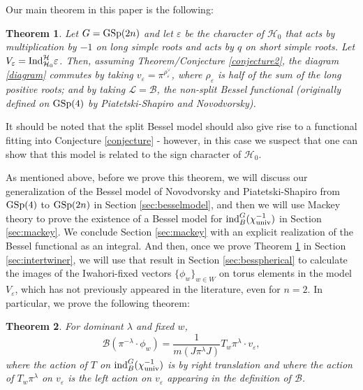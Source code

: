 \documentclass[11pt,letterpaper]{article}
\newcommand{\calL}{\mathcal{L}} %
\newcommand{\calH}{\mathcal{H}} %
\newcommand{\calB}{\mathcal{B}}
\newcommand{\ve}{\varepsilon}
\newcommand{\GSp}{\textup{GSp}}
\newcommand{\Ind}{\textup{Ind}}
\newcommand{\ind}{\textup{ind}}
\newtheorem{Theorem}{Theorem}[section]
\theoremstyle{remark}
\numberwithin{equation}{section}
\begin{document}
Our main theorem in this paper is the following:

\begin{Theorem}\label{thm:main}
Let $G = \GSp(2n)$ and let $\ve$ be the character of $\calH_0$ that acts by multiplication by $-1$ on long simple roots and acts by $q$ on short simple roots. Let $V_{\ve} = \Ind_{\calH_0}^{\calH} \ve$. Then, assuming Theorem/Conjecture \ref{conjecture2}, the diagram \eqref{diagram} commutes by taking $v_{\ve} = \pi^{\rho_{\ve}^{\vee}}$, where $\rho_{\ve}$ is half of the sum of the long positive roots; and by taking $\calL= \calB$, the non-split Bessel functional (originally defined on $\GSp(4)$ by Piatetski-Shapiro and Novodvorsky).
\end{Theorem}

It should be noted that the split Bessel model should also give rise to a functional fitting into Conjecture \ref{conjecture} - however, in this case we suspect that one can show that this model is related to the sign character of $\calH_0$.


As mentioned above, before we prove this theorem, we will discuss our generalization of the Bessel model of Novodvorsky and Piatetski-Shapiro from $\GSp(4)$ to $\GSp(2n)$ in Section \ref{sec:besselmodel}, and then we will use Mackey theory to prove the existence of a Bessel model for $\ind_B^G (\chi_{\textup{univ}}^{-1})$ in Section \ref{sec:mackey}. We conclude Section \ref{sec:mackey} with an explicit realization of the Bessel functional as an integral. And then, once we prove Theorem \ref{thm:main} in Section \ref{sec:intertwiner}, we will use that result in Section \ref{sec:besspherical} to calculate the images of the Iwahori-fixed vectors $\{\phi_w\}_{w \in W}$ on torus elements in the model $V_{\ve}$, which has not previously appeared in the literature, even for $n=2$. In particular, we prove the following theorem:


\begin{Theorem}\label{thm:iwahori}
For dominant $\lambda$ and fixed $w$, $$\calB(\pi^{-\lambda}\cdot \phi_w) = \frac{1}{m(J\pi^{\lambda}J)} T_w \pi^{\lambda} \cdot v_{\ve},$$ where the action of $T$ on $\ind_B^G(\chi_{\textup{univ}}^{-1})$ is by right translation and where the action of $T_w\pi^{\lambda}$ on $v_{\ve}$ is the left action on $v_{\ve}$ appearing in the definition of $\calB$.
\end{Theorem}
\end{document}
